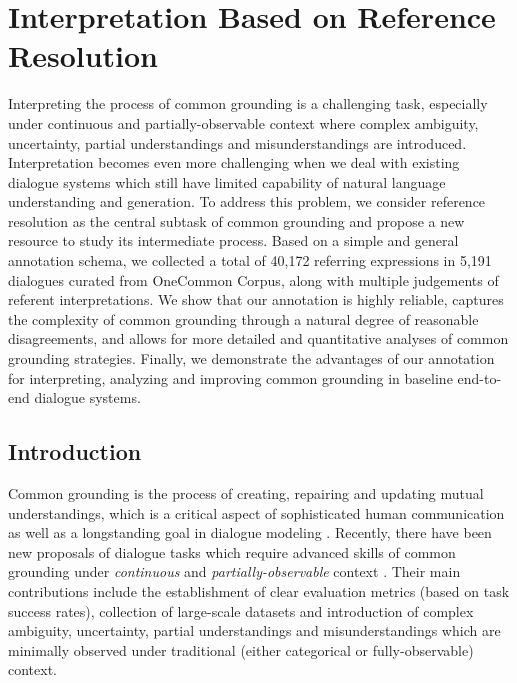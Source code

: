 \graphicspath{{04_interpretation/figures/}} %

\chapter{Interpretation Based on Reference Resolution}
\label{04_chp:interpretation}

Interpreting the process of common grounding is a challenging task, especially under continuous and partially-observable context where complex ambiguity, uncertainty, partial understandings and misunderstandings are introduced. Interpretation becomes even more challenging when we deal with existing dialogue systems which still have limited capability of natural language understanding and generation. To address this problem, we consider reference resolution as the central subtask of common grounding and propose a new resource to study its intermediate process. Based on a simple and general annotation schema, we collected a total of 40,172 referring expressions in 5,191 dialogues curated from OneCommon Corpus, along with multiple judgements of referent interpretations. We show that our annotation is highly reliable, captures the complexity of common grounding through a natural degree of reasonable disagreements, and allows for more detailed and quantitative analyses of common grounding strategies. Finally, we demonstrate the advantages of our annotation for interpreting, analyzing and improving common grounding in baseline end-to-end dialogue systems.

\section{Introduction}
\label{04_sec:introduction}

Common grounding is the process of creating, repairing and updating mutual understandings, which is a critical aspect of sophisticated human communication \citep{clark1996using} as well as a longstanding goal in dialogue modeling \citep{traum1994computational}. Recently, there have been new proposals of dialogue tasks which require advanced skills of common grounding under \textit{continuous} and \textit{partially-observable} context \citep{udagawa2019natural,haber-etal-2019-photobook}. Their main contributions include the establishment of clear evaluation metrics (based on task success rates), collection of large-scale datasets and introduction of complex ambiguity, uncertainty, partial understandings and misunderstandings which are minimally observed under traditional (either categorical or fully-observable) context.

